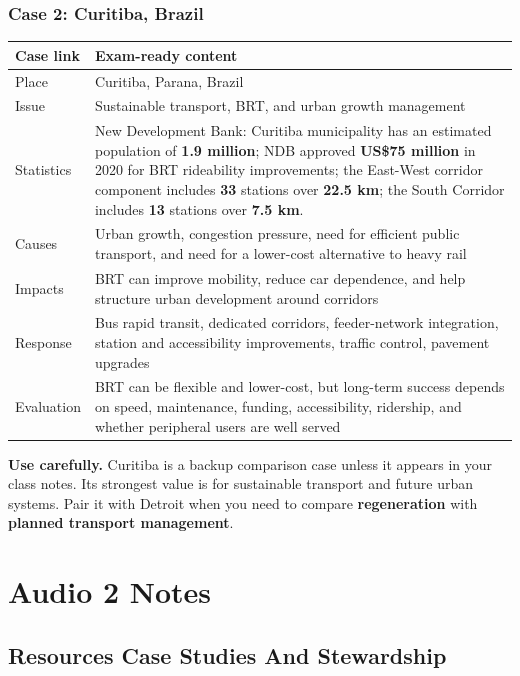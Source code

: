 \documentclass[11pt,a4paper]{article}
\newcommand{\term}[1]{\textcolor{HeadingBlue}{\textbf{#1}}}
\newcommand{\boxnote}[3]{%
\noindent\colorbox{#1}{%
  \begin{minipage}{0.965\textwidth}
  \sffamily
  \textbf{\textcolor{HeadingBlue}{#2}} #3
  \end{minipage}
}}
\begin{document}
\subsubsection{Case 2: Curitiba, Brazil}

\begin{tabularx}{\textwidth}{L{0.18\textwidth}Y}
\toprule
\textbf{Case link} & \textbf{Exam-ready content} \\
\midrule
Place & Curitiba, Parana, Brazil \\
Issue & Sustainable transport, BRT, and urban growth management \\
Statistics & New Development Bank: Curitiba municipality has an estimated
population of \term{1.9 million}; NDB approved \term{US\$75 million} in 2020 for BRT
rideability improvements; the East-West corridor component includes \term{33}
stations over \term{22.5 km}; the South Corridor includes \term{13} stations
over \term{7.5 km}. \\
Causes & Urban growth, congestion pressure, need for efficient public
transport, and need for a lower-cost alternative to heavy rail \\
Impacts & BRT can improve mobility, reduce car dependence, and help structure
urban development around corridors \\
Response & Bus rapid transit, dedicated corridors, feeder-network integration,
station and accessibility improvements, traffic control, pavement upgrades \\
Evaluation & BRT can be flexible and lower-cost, but long-term success depends
on speed, maintenance, funding, accessibility, ridership, and whether peripheral
users are well served \\
\bottomrule
\end{tabularx}

\boxnote{SoftTint}{Use carefully.}{Curitiba is a backup comparison case unless
it appears in your class notes. Its strongest value is for sustainable
transport and future urban systems. Pair it with Detroit when you need to
compare \term{regeneration} with \term{planned transport management}.}

\section{Audio 2 Notes}

\subsection{Resources Case Studies And Stewardship}
\end{document}
